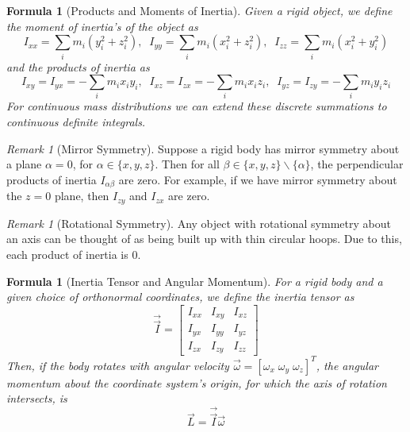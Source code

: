 \documentclass[12pt]{article}
\newtheorem{for}[thm]{Formula}
\theoremstyle{definition}
\theoremstyle{remark}
\newtheorem{rmk}[thm]{Remark}
\numberwithin{equation}{section}
\begin{document}
\vspace{15pt}

\begin{for}[Products and Moments of Inertia]
        Given a rigid object, we define the moment of inertia's of the object as \begin{equation}
                I_{xx} = \sum_im_i(y_i^2+z_i^2), \;\; I_{yy} = \sum_im_i(x_i^2+z_i^2), \;\; I_{zz} = \sum_im_i(x_i^2+y_i^2)
        \end{equation}
        and the products of inertia as \begin{equation}
                I_{xy} = I_{yx} = -\sum_im_ix_iy_i, \;\; I_{xz} = I_{zx} = -\sum_im_ix_iz_i, \;\; I_{yz} = I_{zy} = -\sum_im_iy_iz_i
        \end{equation}
        For continuous mass distributions we can extend these discrete summations to continuous definite integrals. 
\end{for}

\vspace{15pt}


\begin{rmk}[Mirror Symmetry]
        Suppose a rigid body has mirror symmetry about a plane $\alpha = 0$, for $\alpha \in \{x,y,z\}$. Then for all $\beta \in \{x,y,z\}\backslash\{\alpha\}$, the perpendicular products of inertia $I_{\alpha\beta}$ are zero. For example, if we have mirror symmetry about the $z = 0$ plane, then $I_{zy}$ and $I_{zx}$ are zero.
\end{rmk}

\vspace{15pt}

\begin{rmk}[Rotational Symmetry]
        Any object with rotational symmetry about an axis can be thought of as being built up with thin circular hoops. Due to this, each product of inertia is $0$.
\end{rmk}

\vspace{15pt}

\begin{for}[Inertia Tensor and Angular Momentum]
        For a rigid body and a given choice of orthonormal coordinates, we define the inertia tensor as \begin{equation}
                \vec{\vec{I}} = \begin{bmatrix} I_{xx} & I_{xy} & I_{xz} \\ I_{yx} & I_{yy} & I_{yz} \\ I_{zx} & I_{zy} & I_{zz} \end{bmatrix}
        \end{equation}
        Then, if the body rotates with angular velocity $\vec{\omega} = [\omega_x \; \omega_y \; \omega_z]^T$, the angular momentum about the coordinate system's origin, for which the axis of rotation intersects, is \begin{equation}
                \vec{L} = \vec{\vec{I}}\vec{\omega}
        \end{equation}
\end{for}
\end{document}
